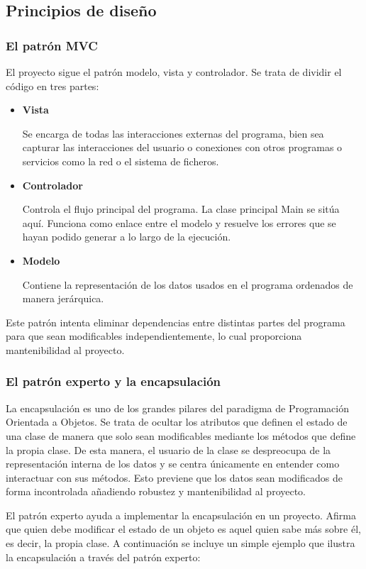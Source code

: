 \documentclass[12pt,a4paper,openright,oneside]{article}
\numberwithin{equation}{section}
\theoremstyle{definition}
\begin{document}
\subsection{Principios de diseño}
\subsubsection{El patrón MVC}

El proyecto sigue el patrón modelo, vista y controlador. Se trata de dividir el código en tres partes:
\begin{itemize}
\item \textbf{Vista}

Se encarga de todas las interacciones externas del programa, bien sea capturar las interacciones del usuario o conexiones con otros programas o servicios como la red o el sistema de ficheros.

\item \textbf{Controlador}

Controla el flujo principal del programa. La clase principal Main se sitúa aquí. Funciona como enlace entre el modelo y resuelve los errores que se hayan podido generar a lo largo de la ejecución.

\item \textbf{Modelo}

Contiene la representación de los datos usados en el programa ordenados de manera jerárquica.
\end{itemize}

Este patrón intenta eliminar dependencias entre distintas partes del programa para que sean modificables independientemente, lo cual proporciona mantenibilidad al proyecto.

\subsubsection{El patrón experto y la encapsulación}
La encapsulación es uno de los grandes pilares del paradigma de Programación Orientada a Objetos. Se trata de ocultar los atributos que definen el estado de una clase de manera que solo sean modificables mediante los métodos que define la propia clase. De esta manera, el usuario de la clase se despreocupa de la representación interna de los datos y se centra únicamente en entender como interactuar con sus métodos. Esto previene que los datos sean modificados de forma incontrolada añadiendo robustez y mantenibilidad al proyecto.

El patrón experto ayuda a implementar la encapsulación en un proyecto. Afirma que quien debe modificar el estado de un objeto es aquel quien sabe más sobre él, es decir, la propia clase. A continuación se incluye un simple ejemplo que ilustra la encapsulación a través del patrón experto:
\end{document}
